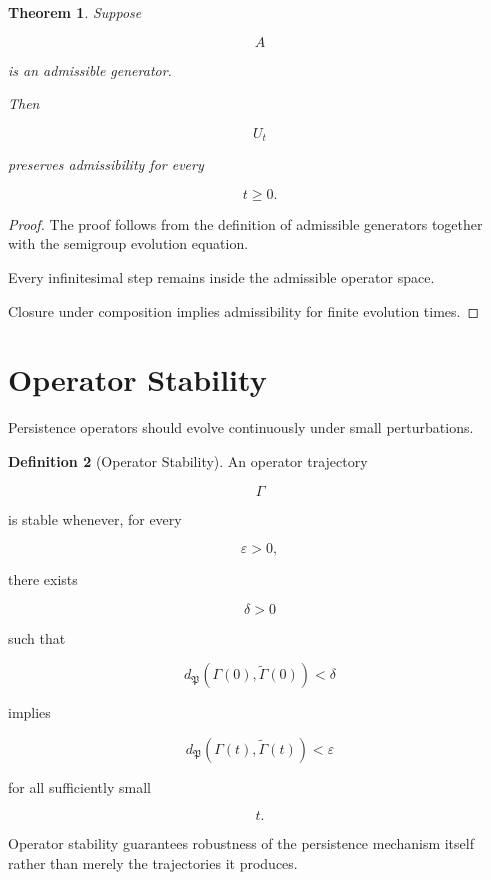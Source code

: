 \documentclass[11pt]{book}
\numberwithin{equation}{chapter}
\theoremstyle{definition}
\newtheorem{definition}{Definition}[chapter]
\theoremstyle{plain}
\newtheorem{theorem}[definition]{Theorem}
\begin{document}
\begin{theorem}

Suppose

\[
A
\]

is an admissible generator.

Then

\[
U_t
\]

preserves admissibility for every

\[
t\ge0.
\]

\end{theorem}

\begin{proof}

The proof follows from the definition of admissible generators together
with the semigroup evolution equation.

Every infinitesimal step remains inside the admissible operator space.

Closure under composition implies admissibility for finite evolution
times.

\end{proof}

\section{Operator Stability}

Persistence operators should evolve continuously under small
perturbations.

\begin{definition}[Operator Stability]

An operator trajectory

\[
\Gamma
\]

is stable whenever, for every

\[
\varepsilon>0,
\]

there exists

\[
\delta>0
\]

such that

\[
d_{\mathfrak P}
(
\Gamma(0),
\widetilde{\Gamma}(0)
)
<
\delta
\]

implies

\[
d_{\mathfrak P}
(
\Gamma(t),
\widetilde{\Gamma}(t)
)
<
\varepsilon
\]

for all sufficiently small

\[
t.
\]

\end{definition}

Operator stability guarantees robustness of the persistence mechanism
itself rather than merely the trajectories it produces.
\end{document}
